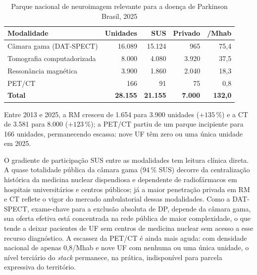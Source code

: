 \documentclass[12pt,a4paper,oneside]{article}
\begin{document}
\begin{table}[htbp]
\centering
\caption{Parque nacional de neuroimagem relevante para a doença de
Parkinson \textendash{} Brasil, 2025}
\begin{tabular}{lrrrr}
\toprule
\textbf{Modalidade} & \textbf{Unidades} & \textbf{SUS} & \textbf{Privado} & \textbf{/Mhab} \\
\midrule
Câmara gama (DAT-SPECT)      & 16.089 & 15.124 & 965   & 75,4 \\
Tomografia computadorizada   &  8.000 &  4.080 & 3.920 & 37,5 \\
Ressonância magnética        &  3.900 &  1.860 & 2.040 & 18,3 \\
PET/CT                       &    166 &     91 &    75 &  0,8 \\
\midrule
\textbf{Total}               & \textbf{28.155} & \textbf{21.155} & \textbf{7.000} & \textbf{132,0} \\
\bottomrule
\end{tabular}
\par{}
\label{tab:agregado}
\end{table}

Entre 2013 e 2025, a RM cresceu de 1.654 para 3.900 unidades
($+135\,\%$) e a CT de 3.581 para 8.000 ($+123\,\%$); a PET/CT partiu
de um parque incipiente para 166 unidades, permanecendo escassa: nove
UF têm zero ou uma única unidade em 2025.

O gradiente de participação SUS entre as modalidades tem leitura
clínica direta. A quase totalidade pública da câmara gama (94\,\% SUS)
decorre da centralização histórica da medicina nuclear \textemdash{}
dispendiosa e dependente de radiofármacos \textemdash{} em hospitais
universitários e centros públicos; já a maior penetração privada em RM
e CT reflete o vigor do mercado ambulatorial dessas modalidades. Como
a DAT-SPECT, exame-chave para a exclusão absoluta de DP, depende da
câmara gama, sua oferta efetiva está concentrada na rede pública de
maior complexidade, o que tende a deixar pacientes de UF sem centros
de medicina nuclear sem acesso a esse recurso diagnóstico. A escassez
da PET/CT é ainda mais aguda: com densidade nacional de apenas
0,8/Mhab e nove UF com nenhuma ou uma única unidade, o nível
terciário do \textit{stack} permanece, na prática, indisponível para
parcela expressiva do território.
\end{document}
